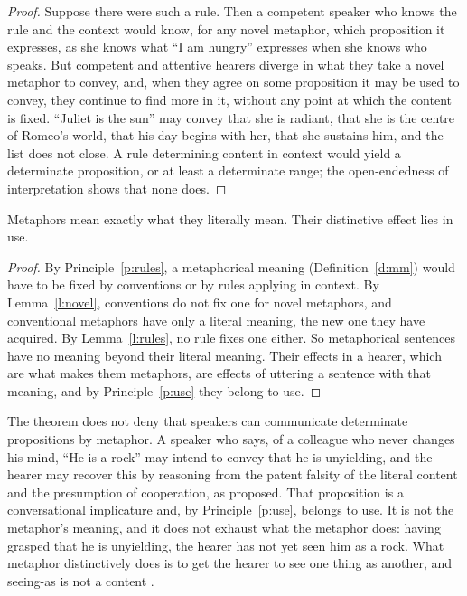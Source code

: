 \documentclass{situationist-preprint}
\begin{document}
\begin{proof}
Suppose there were such a rule. Then a competent speaker who knows the rule and the context would know, for any novel metaphor, which proposition it expresses, as she knows what \enquote{I am hungry} expresses when she knows who speaks. But competent and attentive hearers diverge in what they take a novel metaphor to convey, and, when they agree on some proposition it may be used to convey, they continue to find more in it, without any point at which the content is fixed. \enquote{Juliet is the sun} may convey that she is radiant, that she is the centre of Romeo's world, that his day begins with her, that she sustains him, and the list does not close. A rule determining content in context would yield a determinate proposition, or at least a determinate range; the open-endedness of interpretation shows that none does.
\end{proof}

\begin{theorem}\label{t:main}
Metaphors mean exactly what they literally mean. Their distinctive effect lies in use.
\end{theorem}

\begin{proof}
By Principle~\ref{p:rules}, a metaphorical meaning (Definition~\ref{d:mm}) would have to be fixed by conventions or by rules applying in context. By Lemma~\ref{l:novel}, conventions do not fix one for novel metaphors, and conventional metaphors have only a literal meaning, the new one they have acquired. By Lemma~\ref{l:rules}, no rule fixes one either. So metaphorical sentences have no meaning beyond their literal meaning. Their effects in a hearer, which are what makes them metaphors, are effects of uttering a sentence with that meaning, and by Principle~\ref{p:use} they belong to use.
\end{proof}

The theorem does not deny that speakers can communicate determinate propositions by metaphor. A speaker who says, of a colleague who never changes his mind, \enquote{He is a rock} may intend to convey that he is unyielding, and the hearer may recover this by reasoning from the patent falsity of the literal content and the presumption of cooperation, as \citet{Grice1975} proposed. That proposition is a conversational implicature and, by Principle~\ref{p:use}, belongs to use. It is not the metaphor's meaning, and it does not exhaust what the metaphor does: having grasped that he is unyielding, the hearer has not yet seen him as a rock. What metaphor distinctively does is to get the hearer to see one thing as another, and seeing-as is not a content \citep{Davidson1978,Moran1989}.
\end{document}
